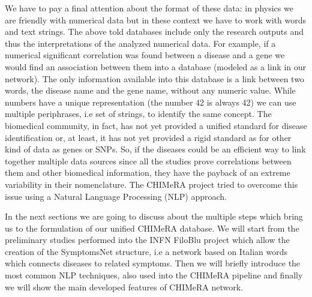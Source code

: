 \documentclass{standalone}
\begin{document}
We have to pay a final attention about the format of these data: in physics we are friendly with numerical data but in these context we have to work with words and text strings.
The above told databases include only the research outputs and thus the interpretations of the analyzed numerical data.
For example, if a numerical significant correlation was found between a disease and a gene we would find an association between them into a database (modeled as a link in our network).
The only information available into this database is a link between two words, the disease name and the gene name, without any numeric value.
While numbers have a unique representation (the number 42 is always 42) we can use multiple periphrases, i.e set of strings, to identify the same concept.
The biomedical community, in fact, has not yet provided a unified standard for disease identification or, at least, it has not yet provided a rigid standard as for other kind of data as genes or SNPs.
So, if the diseases could be an efficient way to link together multiple data sources since all the studies prove correlations between them and other biomedical information, they have the payback of an extreme variability in their nomenclature.
The \textsf{CHIMeRA} project tried to overcome this issue using a Natural Language Processing (NLP) approach.

In the next sections we are going to discuss about the multiple steps which bring us to the formulation of our unified \textsf{CHIMeRA} database.
We will start from the preliminary studies performed into the INFN FiloBlu project which allow the creation of the \textsf{SymptomsNet} structure, i.e a  network based on Italian words which connects diseases to related symptoms.
Then we will briefly introduce the most common NLP techniques, also used into the \textsf{CHIMeRA} pipeline and finally we will show the main developed features of \textsf{CHIMeRA} network.

\end{document}
